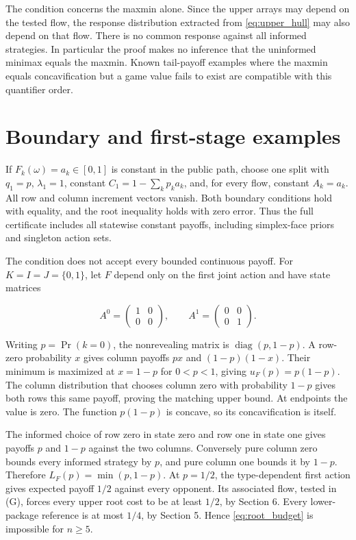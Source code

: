 \documentclass[11pt,a4paper]{article}
\begin{document}
The condition concerns the maxmin alone. Since the upper arrays may depend on the tested flow, the response distribution extracted from \eqref{eq:upper_hull} may also depend on that flow. There is no common response against all informed strategies. In particular the proof makes no inference that the uninformed minimax equals the maxmin. Known tail-payoff examples where the maxmin equals concavification but a game value fails to exist are compatible with this quantifier order.

\section{Boundary and first-stage examples}

If \(F_k(\omega)=a_k\in[0,1]\) is constant in the public path, choose one split with \(q_1=p\), \(\lambda_1=1\), constant \(C_1=1-\sum_kp_ka_k\), and, for every flow, constant \(A_k=a_k\). All row and column increment vectors vanish. Both boundary conditions hold with equality, and the root inequality holds with zero error. Thus the full certificate includes all statewise constant payoffs, including simplex-face priors and singleton action sets.

The condition does not accept every bounded continuous payoff. For \(K=I=J=\{0,1\}\), let \(F\) depend only on the first joint action and have state matrices

\[
A^0=\begin{pmatrix}1&0\\0&0\end{pmatrix},
\qquad A^1=\begin{pmatrix}0&0\\0&1\end{pmatrix}.
\]

Writing \(p=\Pr(k=0)\), the nonrevealing matrix is \(\operatorname{diag}(p,1-p)\). A row-zero probability \(x\) gives column payoffs \(px\) and \((1-p)(1-x)\). Their minimum is maximized at \(x=1-p\) for \(0<p<1\), giving \(u_F(p)=p(1-p)\). The column distribution that chooses column zero with probability \(1-p\) gives both rows this same payoff, proving the matching upper bound. At endpoints the value is zero. The function \(p(1-p)\) is concave, so its concavification is itself.

The informed choice of row zero in state zero and row one in state one gives payoffs \(p\) and \(1-p\) against the two columns. Conversely pure column zero bounds every informed strategy by \(p\), and pure column one bounds it by \(1-p\). Therefore \(L_F(p)=\min(p,1-p)\). At \(p=1/2\), the type-dependent first action gives expected payoff \(1/2\) against every opponent. Its associated flow, tested in (G), forces every upper root cost to be at least \(1/2\), by Section 6. Every lower-package reference is at most \(1/4\), by Section 5. Hence \eqref{eq:root_budget} is impossible for \(n\ge5\).
\end{document}
